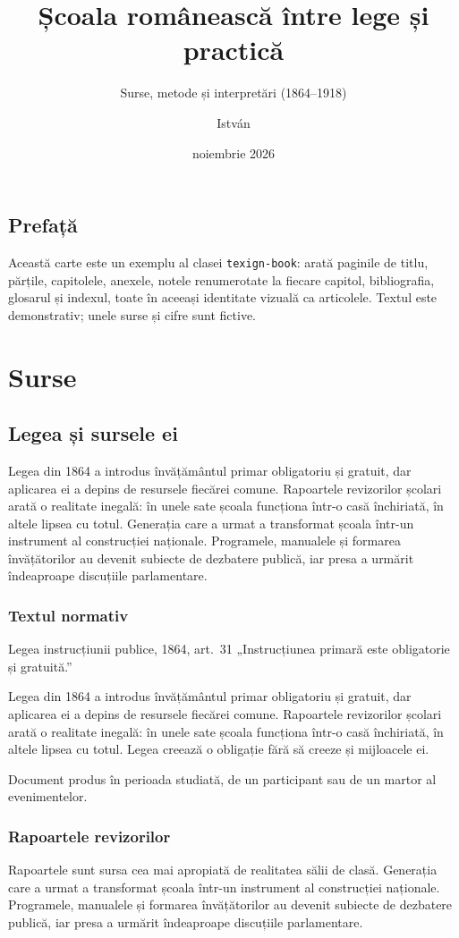 \documentclass{texign-book}
\title{Școala românească între lege și practică}
\subtitle{Surse, metode și interpretări (1864–1918)}
\author{István}
\date{noiembrie 2026}
\newcommand\Para{Legea din 1864 a introdus învățământul primar obligatoriu și gratuit, dar aplicarea ei a depins de resursele fiecărei comune. Rapoartele revizorilor școlari arată o realitate inegală: în unele sate școala funcționa într-o casă închiriată, în altele lipsea cu totul.}
\newcommand\ParaB{Generația care a urmat a transformat școala într-un instrument al construcției naționale. Programele, manualele și formarea învățătorilor au devenit subiecte de dezbatere publică, iar presa a urmărit îndeaproape discuțiile parlamentare.}
\begin{document}
\frontmatter
\maketitle
\tableofcontents

\chapter{Prefață}
Această carte este un exemplu al clasei \texttt{texign-book}: arată paginile de titlu, părțile, capitolele, anexele, notele renumerotate la fiecare capitol, bibliografia, glosarul și indexul, toate în aceeași identitate vizuală ca articolele. Textul este demonstrativ; unele surse și cifre sunt fictive.

\mainmatter
\part{Surse}

\chapter{Legea și sursele ei}\label{cap:lege}

\Para\cite[art.~31]{lege1864} \ParaB{}

\section{Textul normativ}
\begin{source}{Legea instrucțiunii publice, 1864, art.~31}
„Instrucțiunea primară este obligatorie și gratuită.”
\end{source}

\Para\cite[45-48]{iorga1928} Legea creează o obligație fără să creeze și mijloacele ei.

\begin{definition}
Document produs în perioada studiată, de un participant sau de un martor al evenimentelor.
\end{definition}

\section{Rapoartele revizorilor}
Rapoartele  sunt sursa cea mai apropiată de realitatea sălii de clasă.\cite{raport1872} \ParaB\cite[14]{popescu1929}
\end{document}
